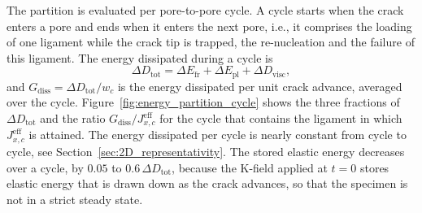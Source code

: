 \documentclass[pdflatex,sn-mathphys-num]{sn-jnl}%
\theoremstyle{thmstyleone}%
\theoremstyle{thmstyletwo}%
\theoremstyle{thmstylethree}%
\begin{document}
The partition is evaluated per pore-to-pore cycle. A cycle starts when the crack enters a pore and ends when it enters the next pore, i.e., it comprises the loading of one ligament while the crack tip is trapped, the re-nucleation and the failure of this ligament. The energy dissipated during a cycle is
\begin{equation}
    \Delta D_{\text{tot}} = \Delta E_{\text{fr}} + \Delta E_{\text{pl}} + \Delta D_{\text{visc}},
    \label{eq:D_tot_cycle}
\end{equation}
and $G_{\text{diss}} = \Delta D_{\text{tot}}/w_c$ is the energy dissipated per unit crack advance, averaged over the cycle. Figure~\ref{fig:energy_partition_cycle} shows the three fractions of $\Delta D_{\text{tot}}$ and the ratio $G_{\text{diss}}/J_{x,c}^{\text{eff}}$ for the cycle that contains the ligament in which $J_{x,c}^{\text{eff}}$ is attained. The energy dissipated per cycle is nearly constant from cycle to cycle, see Section~\ref{sec:2D_representativity}. The stored elastic energy decreases over a cycle, by $0.05$ to $0.6\,\Delta D_{\text{tot}}$, because the K-field applied at $t = 0$ stores elastic energy that is drawn down as the crack advances, so that the specimen is not in a strict steady state.
\end{document}
